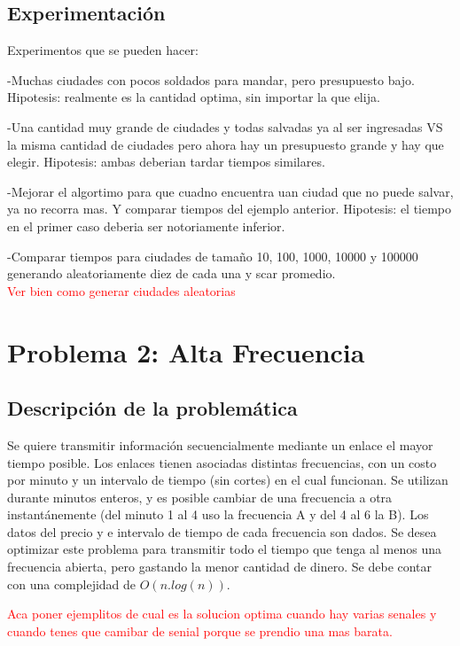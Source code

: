 \documentclass[a4paper]{article}
\begin{document}
\newpage
\subsection{Experimentaci\'on}

\noindent Experimentos que se pueden hacer:

-Muchas ciudades con pocos soldados para mandar, pero presupuesto bajo. Hipotesis: realmente es la cantidad optima, sin importar la que elija.

-Una cantidad muy grande de ciudades y todas salvadas ya al ser ingresadas VS la misma cantidad de ciudades pero ahora hay un presupuesto grande y hay que elegir. Hipotesis: ambas deberian tardar tiempos similares.

-Mejorar el algortimo para que cuadno encuentra uan ciudad que no puede salvar, ya no recorra mas. Y comparar tiempos del ejemplo anterior. Hipotesis: el tiempo en el primer caso deberia ser notoriamente inferior.

-Comparar tiempos para ciudades de tama\~no 10, 100, 1000, 10000 y 100000 generando aleatoriamente diez de cada una y scar promedio.\\



\textcolor{red}{Ver bien como generar ciudades aleatorias}

\newpage

\section{Problema 2: Alta Frecuencia}
\subsection{Descripci\'on de la problem\'atica}

Se quiere transmitir informaci\'on secuencialmente mediante un enlace el mayor tiempo posible. Los enlaces tienen asociadas distintas frecuencias, con un costo por minuto y un intervalo de tiempo (sin cortes) en el cual funcionan. Se utilizan durante minutos enteros, y es posible cambiar de una frecuencia a otra instant\'anemente (del minuto 1 al 4 uso la frecuencia A y del 4 al 6 la B). Los datos del precio y e intervalo de tiempo de cada frecuencia son dados. Se desea optimizar este problema para transmitir todo el tiempo que tenga al menos una frecuencia abierta, pero gastando la menor cantidad de dinero. Se debe contar con una complejidad de $O(n.log(n))$.

\textcolor{red}{Aca poner ejemplitos de cual es la solucion optima cuando hay varias senales y cuando tenes que camibar de senial porque se prendio una mas barata.}
\end{document}
